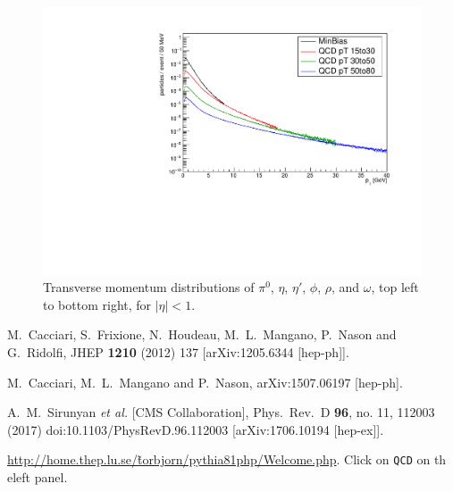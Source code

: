 \documentclass[12pt]{article}
\begin{document}
\begin{figure}
  \includegraphics[width=0.48\linewidth]{plots/h_omega.pdf}
  \caption{\protect Transverse momentum distributions of 
$\pi^0$, $\eta$, $\eta'$, $\phi$, $\rho$, and $\omega$, top left
to bottom right, for $|\eta| < 1$.}
\label{fig:mesons}
\end{figure}



\begin{thebibliography}{1}

  M.~Cacciari, S.~Frixione, N.~Houdeau, M.~L.~Mangano, P.~Nason and G.~Ridolfi,
  JHEP {\bf 1210} (2012) 137 [arXiv:1205.6344 [hep-ph]].

  M.~Cacciari, M.~L.~Mangano and P.~Nason,
  arXiv:1507.06197 [hep-ph].

  A.~M.~Sirunyan {\it et al.} [CMS Collaboration],
  Phys.\ Rev.\ D {\bf 96}, no. 11, 112003 (2017)
  doi:10.1103/PhysRevD.96.112003
  [arXiv:1706.10194 [hep-ex]].

\href{http://home.thep.lu.se/\~torbjorn/pythia81php/Welcome.php}
{http://home.thep.lu.se/\~torbjorn/pythia81php/Welcome.php}.  Click on 
{\tt QCD} on th eleft panel.

\end{thebibliography}  
\end{document}
